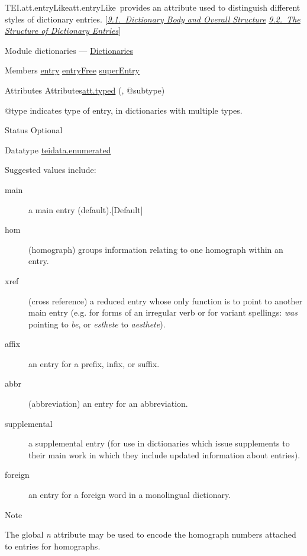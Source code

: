 \begin{reflist}
\item[]\begin{specHead}{TEI.att.entryLike}{att.entryLike} provides an attribute used to distinguish different styles of dictionary entries. [\textit{\hyperref[DIBO]{9.1.\ Dictionary Body and Overall Structure}} \textit{\hyperref[DIEN]{9.2.\ The Structure of Dictionary Entries}}]\end{specHead} 
    \item[{Module}]
  dictionaries — \hyperref[DI]{Dictionaries}
    \item[{Members}]
  \hyperref[TEI.entry]{entry} \hyperref[TEI.entryFree]{entryFree} \hyperref[TEI.superEntry]{superEntry}
    \item[{Attributes}]
  Attributes\hyperref[TEI.att.typed]{att.typed} (, @subtype) \hfil\\[-10pt]\begin{sansreflist}
    \item[@type]
  indicates type of entry, in dictionaries with multiple types.
\begin{reflist}
    \item[{Status}]
  Optional
    \item[{Datatype}]
  \hyperref[TEI.teidata.enumerated]{teidata.enumerated}
    \item[{Suggested values include:}]
  \begin{description}

\item[{main}]a main entry (default).{[Default] }
\item[{hom}](homograph) groups information relating to one homograph within an entry.
\item[{xref}](cross reference) a reduced entry whose only function is to point to another main entry (e.g. for forms of an irregular verb or for variant spellings: \textit{was} pointing to \textit{be}, or \textit{esthete} to \textit{aesthete}).
\item[{affix}]an entry for a prefix, infix, or suffix.
\item[{abbr}](abbreviation) an entry for an abbreviation.
\item[{supplemental}]a supplemental entry (for use in dictionaries which issue supplements to their main work in which they include updated information about entries).
\item[{foreign}]an entry for a foreign word in a monolingual dictionary.
\end{description} 
\end{reflist}  
\end{sansreflist}  
    \item[{Note}]
  \par
The global {\itshape n} attribute may be used to encode the homograph numbers attached to entries for homographs.
\end{reflist}  
